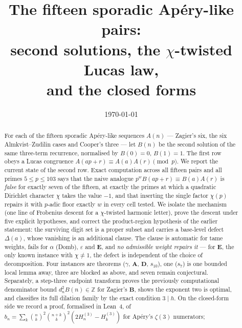 \documentclass[11pt,reqno]{amsart}
\theoremstyle{plain}
\theoremstyle{definition}
\theoremstyle{remark}
\newcommand{\Z}{\mathbb{Z}}
\newcommand{\bin}[2]{\binom{#1}{#2}}
\newcommand{\HH}[2]{H^{(#1)}_{#2}}
\numberwithin{equation}{section}
\begin{document}
\title[The fifteen sporadic Ap\'ery-like pairs]
      {The fifteen sporadic Ap\'ery-like pairs:\\
       second solutions, the $\chi$-twisted Lucas law,\\ and the closed forms}

\author{}
\date{\today}


\begin{abstract}
For each of the fifteen sporadic Ap\'ery-like sequences $A(n)$ --- Zagier's six, the six
Almkvist--Zudilin cases and Cooper's three --- let $B(n)$ be the second solution of the
same three-term recurrence, normalised by $B(0)=0$, $B(1)=1$. The first row obeys a Lucas
congruence $A(ap+r)\equiv A(a)A(r)\pmod p$. We report the current state of the second row.
Exact computation across all fifteen pairs and all primes $5\le p\le 103$ says that the
naive analogue $p^{w}B(ap+r)\equiv B(a)A(r)$ is \emph{false} for exactly seven of the
fifteen, at exactly the primes at which a quadratic Dirichlet character $\chi$ takes the
value $-1$, and that inserting the single factor $\chi(p)$ repairs it with $p$-adic floor
exactly $w$ in every cell tested. We isolate the mechanism (one line of Frobenius descent
for a $\chi$-twisted harmonic letter), prove the descent under five explicit hypotheses,
and correct the product-region hypothesis of the earlier statement: the surviving digit set
is a proper subset and carries a base-level defect $\Delta(a)$, whose vanishing is an
additional clause. The clause is automatic for tame weights, fails for $\alpha$
(Domb), $\varepsilon$ and $\mathbf E$, and \emph{no admissible weight repairs it} --- for
$\mathbf E$, the only known instance with $\chi\ne1$, the defect is independent of the
choice of decomposition. Four instances are theorems ($\gamma$, $\mathbf A$, $\mathbf D$,
$s_{10}$), one ($s_7$) is one bounded local lemma away, three are blocked as above, and
seven remain conjectural. Separately, a step-three endpoint transform proves the previously computational
denominator bound $d_n^2B(n)\in\Z$ for Zagier's $\mathbf B$, shows the exponent two is
optimal, and classifies its full dilation family by the exact condition $3\mid h$.
On the closed-form side we record a proof, formalised in Lean~4,
of $b_n=\sum_k\bin nk^2\bin{n+k}k^2(2\HH3n-\HH3k)$ for Ap\'ery's $\zeta(3)$ numerators;

\end{abstract}
\end{document}
